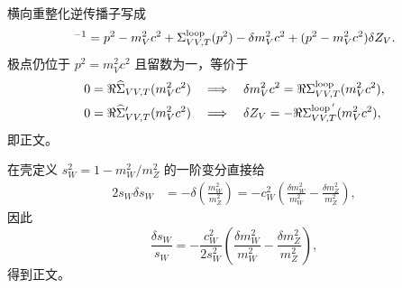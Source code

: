 \begin{derivation}[矢量极点质量与弱混合角反项]
横向重整化逆传播子写成
\begin{equation*}
 [D_{V,T}(p^2)]^{-1}
 =p^2-m_V^2c^2+\Sigma_{VV,T}^{\rm loop}(p^2)
 -\delta m_V^2c^2+(p^2-m_V^2c^2)\delta Z_V.
\end{equation*}
极点仍位于 $p^2=m_V^2c^2$ 且留数为一，等价于
\begin{align*}
 0&=\Re\widehat\Sigma_{VV,T}(m_V^2c^2)
 \quad\Longrightarrow\quad
 \delta m_V^2c^2=\Re\Sigma_{VV,T}^{\rm loop}(m_V^2c^2),\\
 0&=\Re\widehat\Sigma'_{VV,T}(m_V^2c^2)
 \quad\Longrightarrow\quad
 \delta Z_V=-\Re\Sigma_{VV,T}^{{\rm loop}\,'}(m_V^2c^2),
\end{align*}
即正文。

在壳定义 $s_W^2=1-m_W^2/m_Z^2$ 的一阶变分直接给
\begin{align*}
 2s_W\delta s_W
 &= -\delta\!\left(\frac{m_W^2}{m_Z^2}\right)
 =-c_W^2\left(
 \frac{\delta m_W^2}{m_W^2}-\frac{\delta m_Z^2}{m_Z^2}
 \right),
\end{align*}
因此
\begin{equation*}
 \frac{\delta s_W}{s_W}
 =-\frac{c_W^2}{2s_W^2}
 \left(
 \frac{\delta m_W^2}{m_W^2}-\frac{\delta m_Z^2}{m_Z^2}
 \right),
\end{equation*}
得到正文。
\end{derivation}

